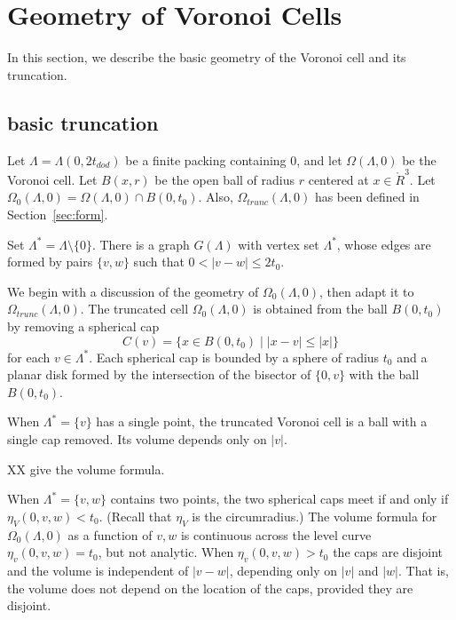 \section{Geometry of Voronoi Cells}

In this section, we describe the basic geometry of the
 Voronoi cell and
its truncation.  

\subsection{basic truncation}

Let $\Lambda = \Lambda(0,2t_{dod})$ be a finite
packing containing $0$, and let $\Omega(\Lambda,0)$ be the Voronoi cell.
Let $B(x,r)$ be the open ball of
radius $r$ centered at $x\in\ring{R}^3$.
Let $\Omega_0(\Lambda,0) = \Omega(\Lambda,0)\cap B(0,t_0)$.
Also, $\Omega_{trunc}(\Lambda,0)$ 
has been defined in Section~\ref{sec:form}.

Set $\Lambda^* = \Lambda\setminus\{0\}$.  There is a graph $G(\Lambda)$
with vertex set $\Lambda^*$, whose edges are formed by pairs
$\{v,w\}$ such that $0<|v-w|\le 2t_0$.  

We begin with a discussion of the geometry of $\Omega_0(\Lambda,0)$,
then adapt it to $\Omega_{trunc}(\Lambda,0)$.  The truncated cell
$\Omega_0(\Lambda,0)$ is obtained from the ball $B(0,t_0)$ by
removing a spherical cap
   $$
   C(v) = \{x \in B(0,t_0) \mid  |x - v| \le |x| \}
   $$
for each $v\in\Lambda^*$.
Each spherical cap is bounded by a sphere of radius $t_0$ and
a planar disk formed by the intersection of the bisector of 
$\{0,v\}$ with the ball $B(0,t_0)$.

When $\Lambda^* = \{v\}$ has a single point, the truncated Voronoi
cell is a ball with a single cap removed.  Its volume depends
only on $|v|$.   

XX give the volume formula.

When $\Lambda^*=\{v,w\}$ contains two points, the two spherical
caps meet if and only if $\eta_V(0,v,w) < t_0$.  (Recall that
$\eta_V$ is the circumradius.)   The volume formula for
$\Omega_0(\Lambda,0)$ as a function of $v,w$ is continuous
across the level curve $\eta_v(0,v,w)=t_0$, but not analytic.
When $\eta_v(0,v,w) > t_0$ the caps are disjoint and the
volume is independent of $|v-w|$, depending only on $|v|$ and $|w|$.
That is, the volume does not depend on the location of the caps,
provided they are disjoint.


